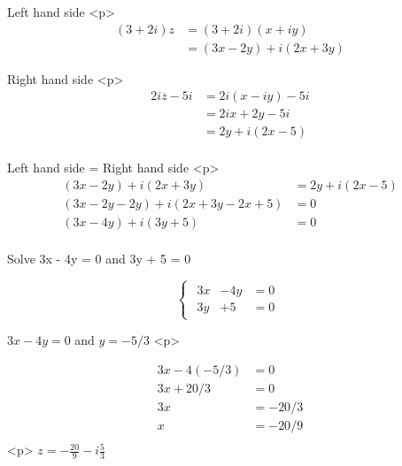 Left hand side
<p>
$$\begin{aligned}
(3+2i)z &= (3+2i)(x + iy)\\
&= (3x-2y)+i(2x+3y)
\end{aligned}$$

Right hand side
<p>
$$\begin{aligned}
2i\overline{z}-5i &=  2i(x-iy)-5i \\
&= 2ix+2y-5i \\
&= 2y + i(2x-5) \\
\end{aligned}$$

Left hand side = Right hand side
<p>
$$\begin{aligned}
(3x-2y)+i(2x+3y) &= 2y + i(2x-5) \\
(3x-2y-2y)+i(2x+3y-2x+5) &= 0 \\
(3x-4y)+i(3y+5) &= 0 \\
\end{aligned}$$

Solve 3x - 4y = 0 and 3y + 5 = 0

$$\begin{cases}
\begin{aligned}
3x &- 4y &= 0 \\
3y &+ 5 &= 0 
\end{aligned}
\end{cases}$$

$3x - 4y = 0$  and
$y  = -5/3 $
<p>

$$\begin{aligned}
3x - 4(-5/3) &= 0\\
3x + 20/3 &= 0\\
3x &= -20/3\\
x &= -20/9 \\
\end{aligned}$$
<p>
$z = -\frac{20}{9} -i\frac{5}{3}$

